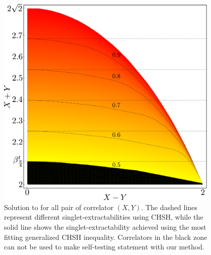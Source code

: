 \begin{figure}
	\begin{center}
		\includegraphics[width=0.95\textwidth]{chapters/selftesting/img/generalizedCHSH.pdf}
	\end{center}
	\caption{Solution to  for all pair of correlator $(X,Y)$. The dashed lines represent different singlet-extractabilities using CHSH, while the solid line shows the singlet-extractability achieved using the most fitting generalized CHSH inequality. Correlators in the black zone can not be used to make self-testing statement with our method.}
	\label{fig:generalizedCHSHfid}
\end{figure}

